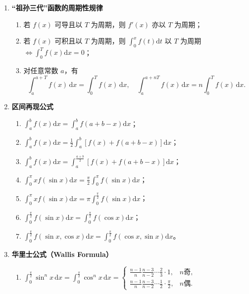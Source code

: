 \begin{enumerate}
    \item \textbf{“祖孙三代”函数的周期性规律}
          \begin{enumerate}
              \item 若 $f(x)$ 可导且以 $T$ 为周期，则 $f'(x)$ 亦以 $T$ 为周期；
              \item 若 $f(x)$ 可积且以 $T$ 为周期，则
                    $\displaystyle \int_{0}^{x}f(t)\mathrm{d}t$
                    以 $T$ 为周期 $\Leftrightarrow \int_{0}^{T}f(x)\mathrm{d}x=0$；
              \item 对任意常数 $a$，有
                    $$
                        \int_{a}^{a+T}f(x)\,\mathrm{d}x=\int_{0}^{T}f(x)\,\mathrm{d}x,
                        \quad
                        \int_{a}^{a+nT}f(x)\,\mathrm{d}x=n\int_{0}^{T}f(x)\,\mathrm{d}x.
                    $$
          \end{enumerate}

    \item \textbf{区间再现公式}
          \begin{enumerate}
              \item $\displaystyle \int_{a}^{b}f(x)\mathrm{d}x=\int_{a}^{b}f(a+b-x)\mathrm{d}x$；
              \item $\displaystyle \int_{a}^{b}f(x)\mathrm{d}x=\tfrac{1}{2}\int_{a}^{b}[f(x)+f(a+b-x)]\mathrm{d}x$；
              \item $\displaystyle \int_{a}^{b}f(x)\mathrm{d}x=\int_{a}^{\frac{a+b}{2}}[f(x)+f(a+b-x)]\mathrm{d}x$；
              \item $\displaystyle \int_{0}^{\pi}xf(\sin x)\mathrm{d}x=\tfrac{\pi}{2}\int_{0}^{\pi}f(\sin x)\mathrm{d}x$；
              \item $\displaystyle \int_{0}^{\pi}xf(\sin x)\mathrm{d}x=\pi\int_{0}^{\frac{\pi}{2}}f(\sin x)\mathrm{d}x$；
              \item $\displaystyle \int_{0}^{\frac{\pi}{2}}f(\sin x)\mathrm{d}x=\int_{0}^{\frac{\pi}{2}}f(\cos x)\mathrm{d}x$；
              \item $\displaystyle \int_{0}^{\frac{\pi}{2}}f(\sin x,\cos x)\mathrm{d}x=\int_{0}^{\frac{\pi}{2}}f(\cos x,\sin x)\mathrm{d}x$。
          \end{enumerate}

    \item \textbf{华里士公式（Wallis Formula）}
          \begin{enumerate}
              \item $\displaystyle \int_{0}^{\frac{\pi}{2}}\!\sin^n x\,\mathrm{d}x
                        =\!\int_{0}^{\frac{\pi}{2}}\!\cos^n x\,\mathrm{d}x
                        =\begin{cases}
                            \frac{n-1}{n}\frac{n-3}{n-2}\cdots\frac{2}{3}\cdot1,             & n\text{奇}, \\[4pt]
                            \frac{n-1}{n}\frac{n-3}{n-2}\cdots\frac{1}{2}\cdot\frac{\pi}{2}, & n\text{偶}.
                        \end{cases}$


\end{enumerate}
\end{enumerate}
